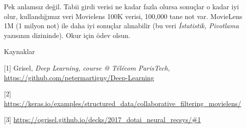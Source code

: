 \documentclass[12pt,fleqn]{article}\usepackage{../../common}
\begin{document}
Pek anlamsız değil. Tabii girdi verisi ne kadar fazla olursa sonuçlar o
kadar iyi olur, kullandığımız veri Movielens 100K verisi, 100,000 tane not
var. MovieLens 1M (1 milyon not) ile daha iyi sonuçlar alınabilir (bu veri
{\em İstatistik, Pivotlama} yazısının dizininde). Okur için ödev olsun.

Kaynaklar

[1] Grisel, {\em Deep Learning, course @ Télécom ParisTech}, \url{https://github.com/petermartigny/Deep-Learning}

[2] \url{https://keras.io/examples/structured_data/collaborative_filtering_movielens/}

[3] \url{https://ogrisel.github.io/decks/2017_dotai_neural_recsys/#1}
\end{document}
